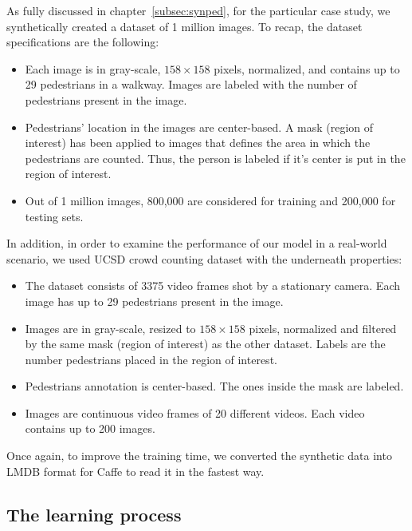 As fully discussed in chapter~\ref{subsec:synped}, for the particular case study, we synthetically created a dataset of 1 million images. To recap, the dataset specifications are the following:
\begin{itemize}
\item Each image is in gray-scale, $158\times158$ pixels, normalized, and contains up to 29 pedestrians in a walkway. Images are labeled with the number of pedestrians present in the image.  
\item Pedestrians' location in the images are center-based. A mask (region of interest) has been applied to images that defines the area in which the pedestrians are counted. Thus, the person is labeled if it's center is put in the region of interest.   
\item Out of 1 million images, 800,000 are considered for training and 200,000 for testing sets.
\end{itemize} 

\noindent In addition, in order to examine the performance of our model in a real-world scenario, we used UCSD crowd counting dataset \cite{chan2008privacy} with the underneath properties:

\begin{itemize}
\item The dataset consists of 3375 video frames shot by a stationary camera. Each image has up to 29 pedestrians present in the image.
\item Images are in gray-scale, resized to $158\times158$ pixels, normalized and filtered by the same mask (region of interest) as the other dataset. Labels are the number pedestrians placed in the region of interest.
\item Pedestrians annotation is center-based. The ones inside the mask are labeled.  
\item Images are continuous video frames of 20 different videos. Each video contains up to 200 images.  
\end{itemize}

Once again, to improve the training time, we converted the synthetic data into LMDB format for Caffe to read it in the fastest way.


\subsection{The learning process}

